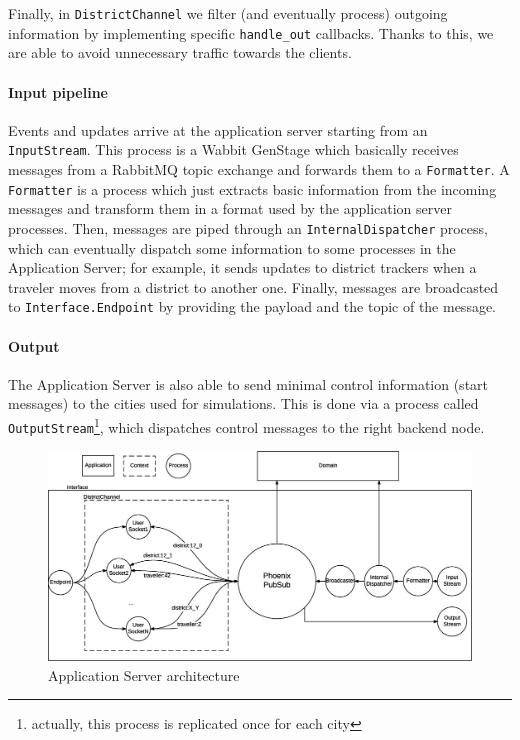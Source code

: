 Finally, in \texttt{DistrictChannel} we filter (and eventually process)
outgoing information by implementing specific \texttt{handle\_out} callbacks.
Thanks to this, we are able to avoid unnecessary traffic towards the clients.

\paragraph{Input pipeline}
Events and updates arrive at the application server starting from an
\texttt{InputStream}. This process is a Wabbit GenStage which
basically receives messages from a RabbitMQ topic exchange and forwards them
to a \texttt{Formatter}.
A \texttt{Formatter} is a process which just extracts basic information from
the incoming messages and transform them in a format used by the application
server processes.
Then, messages are piped through an \texttt{InternalDispatcher} process, which
can eventually dispatch some information to some processes in the Application
Server; for example, it sends updates to district trackers when a traveler
moves from a district to another one.
Finally, messages are broadcasted to \texttt{Interface.Endpoint} by
providing the payload and the topic of the message.

\paragraph{Output}
The Application Server is also able to send minimal control information (start
messages) to the cities used for simulations. This is done via a process called
\texttt{OutputStream}\footnote{actually, this process is replicated once for
each city}, which dispatches control messages to the right backend node.

\begin{figure}[H]
  \centering
  \includegraphics[width=1.1\columnwidth]{images/implementation/as-chan-pubsub.eps}
  \caption{Application Server architecture}
  \label{fig:impl-as-pubsub}
\end{figure}
